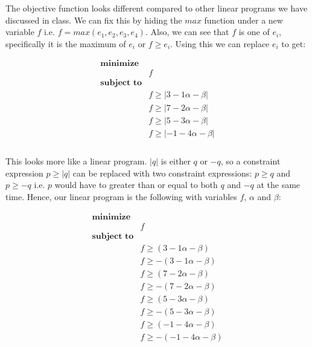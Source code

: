 \documentclass{article}
\begin{document}
    The objective function looks different compared to other linear programs we have discussed in class. We can fix this by hiding the $max$ function under a new variable $f$ i.e. $f = max(e_1, e_2, e_3, e_4)$. Also, we can see that $f$ is one of $e_i$, specifically it is the maximum of $e_i$ or $f \ge e_i$. Using this we can replace $e_i$ to get:

    \begin{equation*}
        \begin{aligned}
            \textbf{minimize} \\
            & f \\
            \textbf{subject to} \\
            & f \ge |3 - 1\alpha - \beta| \\
            & f \ge |7 - 2\alpha - \beta| \\
            & f \ge |5 - 3\alpha - \beta| \\
            & f \ge |-1 - 4\alpha - \beta| \\
        \end{aligned}
    \end{equation*} \\

    This looks more like a linear program. $|q|$ is either $q$ or $-q$, so a constraint expression $p \ge |q|$ can be replaced with two constraint expressions: $p \ge q$ and $p \ge -q$ i.e. $p$ would have to greater than or equal to both $q$ and $-q$ at the same time. Hence, our linear program is the following with variables $f$, $\alpha$ and $\beta$:

    \begin{equation*}
        \begin{aligned}
            \textbf{minimize} \\
            & f \\
            \textbf{subject to} \\
            & f \ge (3 - 1\alpha - \beta) \\
            & f \ge -(3 - 1\alpha - \beta) \\
            & f \ge (7 - 2\alpha - \beta) \\
            & f \ge -(7 - 2\alpha - \beta) \\
            & f \ge (5 - 3\alpha - \beta) \\
            & f \ge -(5 - 3\alpha - \beta) \\
            & f \ge (-1 - 4\alpha - \beta) \\
            & f \ge -(-1 - 4\alpha - \beta) \\
        \end{aligned}
    \end{equation*} \\
\end{document}

